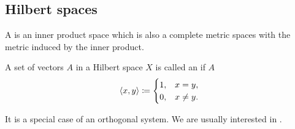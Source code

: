 \subsection{Hilbert spaces}\label{subsec:hilbert_spaces}

\begin{definition}\label{def:hilbert_space}
  A  is an inner product space which is also a complete metric spaces with the metric induced by the inner product.
\end{definition}

\begin{definition}\label{def:orthonormal_system}
  A set of vectors \( A \) in a Hilbert space \( X \) is called an  if \( A \)
  \begin{equation*}
    \left\langle x, y \right\rangle \coloneqq \begin{cases}
      1, &x = y, \\
      0, &x \neq y.
    \end{cases}
  \end{equation*}

  It is a special case of an orthogonal system. We are usually interested in .
\end{definition}
